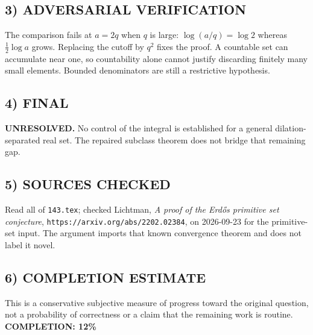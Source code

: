 \subsection{3) ADVERSARIAL VERIFICATION}
The comparison fails at $a=2q$ when $q$ is large: $\log(a/q)=\log2$ whereas $\tfrac12\log a$ grows. Replacing the cutoff by $q^2$ fixes the proof. A countable set can accumulate near one, so countability alone cannot justify discarding finitely many small elements. Bounded denominators are still a restrictive hypothesis.
\subsection{4) FINAL}
\textbf{UNRESOLVED.}
No control of the integral is established for a general dilation-separated real set. The repaired subclass theorem does not bridge that remaining gap.
\subsection{5) SOURCES CHECKED}
Read all of \texttt{143.tex}; checked Lichtman, \emph{A proof of the Erd\H{o}s primitive set conjecture}, \texttt{https://arxiv.org/abs/2202.02384}, on 2026-09-23 for the primitive-set input. The argument imports that known convergence theorem and does not label it novel.
\subsection{6) COMPLETION ESTIMATE}
This is a conservative subjective measure of progress toward the original question, not a probability of correctness or a claim that the remaining work is routine.
\textbf{COMPLETION: 12\%}
